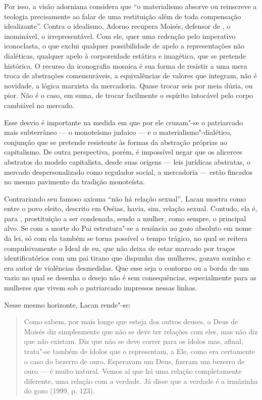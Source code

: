 Por isso, a visão adorniana considera que ``o materialismo absorve ou
reinscreve a teologia precisamente ao falar de uma restituição além de
toda compensação idealizante''. Contra o idealismo, Adorno recupera
Moisés, defensor de , o inominável, o irrepresentável. Com ele, quer
uma redenção pelo imperativo iconoclasta, o que exclui qualquer
possibilidade de apelo a representações não dialéticas, qualquer apelo à
corporeidade estática e imagética, que se pretende histórica. O recurso
da iconografia mosaica é sua forma de resistir a uma mera troca de
abstrações comensuráveis, a equivalências de valores que integram, não é
novidade, a lógica marxista da mercadoria. Quase trocar seis por meia
dúzia, ou pior. Não é o caso, em suma, de trocar facilmente o espírito
intocável pelo corpo cambiável no mercado.

Esse desvio é importante na medida em que por ele cruzam"-se o
patriarcado mais subterrâneo --- o monoteísmo judaico --- e o
materialismo"-dialético, conjunção que se pretende resistente às formas
da abstração próprias ao capitalismo. De outra perspectiva, porém, é
impossível negar que os alicerces abstratos do modelo capitalista, desde
suas origens --- leis jurídicas abstratas, o mercado despersonalizado
como regulador social, a mercadoria --- estão fincados no mesmo pavimento
da tradição monoteísta.

Contrariando seu famoso axioma ``não há relação sexual'', Lacan mostra
como entre o povo eleito, descrito em Oséias, havia, sim, relação
sexual. Contudo, ela é, para , prostituição a ser condenada, sendo a
mulher, como sempre, o principal alvo. Se com a morte do Pai
estrutura"-se a renúncia ao gozo absoluto em nome da lei, só com ela
também se torna possível o tempo trágico, no qual se reitera
compulsivamente o Ideal de eu, que não deixa de estar marcado por traços
identificatórios com um pai tirano que dispunha das mulheres, gozava
sozinho e era autor de violências desmedidas. Que esse seja o contorno
ou a borda de um vazio no qual se desenha o desejo não é sem
consequências, especialmente para as mulheres que vivem sob o
patriarcado impressos nessas linhas.

Nesse mesmo horizonte, Lacan rende"-se:

\begin{quote}
Como sabem, por mais longe que esteja dos outros deuses, o Deus de
Moisés diz simplesmente que não se deve ter relações com eles, mas não
diz que não existam. Diz que não se deve correr para os ídolos mas,
afinal, trata"-se também de ídolos que o representam, a Ele, como era
certamente o caso do bezerro de ouro. Esperavam um Deus, fizeram um
bezerro de ouro --- é muito natural. Vemos aí que há uma relação
completamente diferente, uma relação com a verdade. Já disse que a
verdade é a irmãzinha do gozo (1999, p. 123).
\end{quote}

